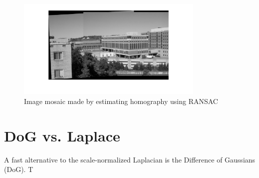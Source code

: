 \documentclass[a4paper,10pt]{article}
\begin{document}
\begin{figure}[h!t]
\centering
\includegraphics[width=0.8\textwidth]{img/mosaic}
\caption{Image mosaic made by estimating homography using RANSAC}
\label{fig:mosaic}
\end{figure}

\section{DoG vs. Laplace}
A fast alternative to the scale-normalized Laplacian is the Difference of Gaussians (DoG).
T



\end{document}
